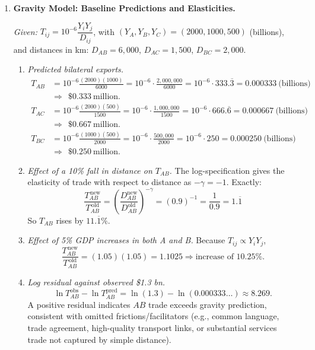 \documentclass[11pt]{article}
\begin{document}
\begin{enumerate}[leftmargin=*, resume]
\item \textbf{Gravity Model: Baseline Predictions and Elasticities.}

\emph{Given:} $T_{ij}=10^{-6}\dfrac{Y_iY_j}{D_{ij}}$, with $(Y_A,Y_B,Y_C)=(2000,1000,500)$ (billions), and distances in km:
$D_{AB}=6{,}000$, $D_{AC}=1{,}500$, $D_{BC}=2{,}000$.

\begin{enumerate}
\item \emph{Predicted bilateral exports.}
\[
\begin{aligned}
T_{AB}&=10^{-6}\frac{(2000)(1000)}{6000}
=10^{-6}\cdot \frac{2{,}000{,}000}{6000}
=10^{-6}\cdot 333.\overline{3}
=0.000333\ \text{(billions)}\\
&\Rightarrow \ \ \$0.333\ \text{million.}\\[6pt]
T_{AC}&=10^{-6}\frac{(2000)(500)}{1500}
=10^{-6}\cdot \frac{1{,}000{,}000}{1500}
=10^{-6}\cdot 666.\overline{6}
=0.000667\ \text{(billions)}\\
&\Rightarrow \ \ \$0.667\ \text{million.}\\[6pt]
T_{BC}&=10^{-6}\frac{(1000)(500)}{2000}
=10^{-6}\cdot \frac{500{,}000}{2000}
=10^{-6}\cdot 250
=0.000250\ \text{(billions)}\\
&\Rightarrow \ \ \$0.250\ \text{million.}
\end{aligned}
\]

\item \emph{Effect of a 10\% fall in distance on $T_{AB}$.} The log-specification gives the elasticity of trade with respect to distance as $-\gamma=-1$. Exactly:
\[
\frac{T_{AB}^{\,\text{new}}}{T_{AB}^{\,\text{old}}}
=\left(\frac{D_{AB}^{\text{new}}}{D_{AB}^{\text{old}}}\right)^{-\gamma}
=(0.9)^{-1}=\frac{1}{0.9}=1.\overline{1}
\]
So $T_{AB}$ rises by $11.\overline{1}\%$.

\item \emph{Effect of 5\% GDP increases in both A and B.} Because $T_{ij}\propto Y_iY_j$,
\[
\frac{T_{AB}^{\,\text{new}}}{T_{AB}^{\,\text{old}}}=(1.05)(1.05)=1.1025 \Rightarrow \text{increase of } 10.25\%.
\]

\item \emph{Log residual against observed \$1.3 bn.} 
\[
\ln T^{\text{obs}}_{AB}-\ln T^{\text{pred}}_{AB}
=\ln(1.3)-\ln(0.000333\ldots)\approx 8.269.
\]
A positive residual indicates $AB$ trade exceeds gravity prediction, consistent with omitted frictions/facilitators (e.g., common language, trade agreement, high-quality transport links, or substantial services trade not captured by simple distance).
\end{enumerate}


\end{enumerate}
\end{document}
